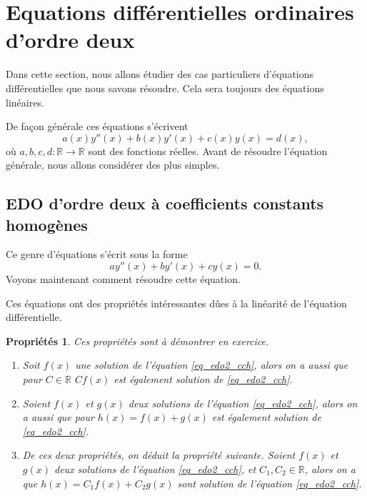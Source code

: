 \documentclass[a4paper,12pt]{book}
\newcommand{\real}{\mathbb{R}}
\newtheorem{proprietes}{Propriétés}
\begin{document}
\section{Equations différentielles ordinaires d'ordre deux}

Dans cette section, nous allons étudier des cas particuliers d'équations différentielles que nous savons résoudre.
Cela sera toujours des équations linéaires.

De façon générale ces équations s'écrivent
\begin{equation}
 a(x)y''(x)+b(x)y'(x)+c(x)y(x)=d(x),
\end{equation}
où $a,b,c,d:\real\rightarrow\real$ sont des fonctions réelles. Avant de résoudre l'équation générale, nous
allons considérer des plus simples.

\subsection{EDO d'ordre deux à coefficients constants homogènes}

Ce genre d'équations s'écrit sous la forme
\begin{equation}
 a y''(x)+by'(x)+cy(x)=0.\label{eq_edo2_cch}
\end{equation}
Voyons maintenant comment résoudre cette équation.

Ces équations ont des propriétés intéressantes dûes à la linéarité 
de l'équation différentielle.
\begin{proprietes}
Ces propriétés sont à démontrer en exercice.
 \begin{enumerate}
  \item Soit $f(x)$ une solution de l'équation \eqref{eq_edo2_cch}, alors on a aussi que pour $C\in\real$ $Cf(x)$ est également solution de \eqref{eq_edo2_cch}.
  \item Soient $f(x)$ et $g(x)$ deux solutions de l'équation \eqref{eq_edo2_cch}, alors on a aussi que pour $h(x)=f(x)+g(x)$ est également solution de \eqref{eq_edo2_cch}.
  \item De ces deux propriétés, on déduit la propriété suivante. Soient $f(x)$ et $g(x)$ deux solutions de l'équation \eqref{eq_edo2_cch}, et $C_1,C_2\in\real$, alors on a que $h(x)=C_1f(x)+C_2g(x)$ sont solution de l'équation \eqref{eq_edo2_cch}.
 \end{enumerate}
\end{proprietes}
\end{document}
